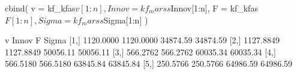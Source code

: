 \begin{Schunk}
\begin{Sinput}
 cbind(
   v = kf_kfas$v[1:n], Innov = kf_marss$Innov[1:n],
   F = kf_kfas$F[1:n], Sigma = kf_marss$Sigma[1:n]
 )
\end{Sinput}
\begin{Soutput}
             v     Innov        F    Sigma
[1,] 1120.0000 1120.0000 34874.59 34874.59
[2,] 1127.8849 1127.8849 50056.11 50056.11
[3,]  566.2762  566.2762 60035.34 60035.34
[4,]  566.5180  566.5180 63845.84 63845.84
[5,]  250.5766  250.5766 64986.59 64986.59
\end{Soutput}
\end{Schunk}
